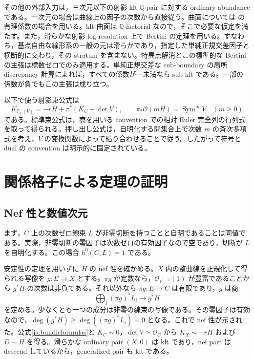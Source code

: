 \documentclass[12pt]{amsart}
\theoremstyle{definition}
\theoremstyle{remark}
\numberwithin{equation}{section}
\newcommand{\cO}{\mathcal{O}}
\DeclareMathOperator{\Sym}{Sym}
\newcommand{\Q}{\mathbb{Q}}
\newcommand{\mP}{\mathbb{P}}
\begin{document}
その他の外部入力は，三次元以下の射影 klt $\Q$-pair に対する ordinary abundance \cite{ja-Fuj,ja-KMM} である。一次元の場合は曲線上の因子の次数から直接従う。曲面については \cite[Theorem 6.1]{ja-Fuj} の有理係数の場合を用いる。klt 曲面は $\Q$-factorial なので，そこで必要な仮定を満たす。また，滑らかな射影 log resolution 上で Bertini の定理を用いる。すなわち，基点自由な線形系の一般の元は滑らかであり，指定した単純正規交差因子と横断的に交わり，その stratum を含まない。特異点解消とこの標準的な Bertini の主張は標数ゼロでのみ適用する。単純正規交差な sub-boundary の局所 discrepancy 計算によれば，すべての係数が一未満なら sub-klt である。一部の係数が負でもこの主張は成り立つ。

以下で使う射影束公式は
\begin{equation}\label{ja:bundleformulas}
 K_{\mP_C(V)}=-rH+\pi^*(K_C+\det V),\qquad
 \pi_*\cO(mH)=\Sym^m V\quad(m\geq0)
\end{equation}
である。標準束公式は，商を用いる convention での相対 Euler 完全列の行列式を取って得られる。押し出し公式は，自明化する開集合上で次数 $m$ の斉次多項式を考え，$V$ の変換関数によって貼り合わせることで従う。したがって符号と dual の convention は明示的に固定されている。

\section{関係格子による定理の証明}\label{ja:proof}
\subsection{Nef 性と数値次元}
まず，$C$ 上の次数ゼロ線束 $L$ が非零切断を持つことと自明であることは同値である。実際，非零切断の零因子は次数ゼロの有効因子なので空であり，切断が $L$ を自明化する。この場合 $h^0(C,L)=1$ である。

安定性の定理を用いずに $H$ の nef 性を確かめる。$X$ 内の整曲線を正規化して得られる写像を $g:E\to X$ とする。$\pi g$ が定数なら，$\cO_{\mP^{r-1}}(1)$ が豊富であることから $g^*H$ の次数は非負である。それ以外なら $\pi g:E\to C$ は有限であり，$g$ は商
\[
 \bigoplus_i(\pi g)^*L_i\longrightarrow g^*H
\]
を定める。少なくとも一つの成分は非零の線束の写像である。その零因子は有効なので，$\deg(g^*H)\geq\deg((\pi g)^*L_i)=0$ となる。これで nef 性が示された。公式\eqref{ja:bundleformulas}と $K_C\sim0$，$\det V\simeq\cO_C$ から $K_X\sim-rH$ および $D\sim H$ を得る。滑らかな ordinary pair $(X,0)$ は klt であり，nef part は descend しているから，generalized pair も klt である。
\end{document}
